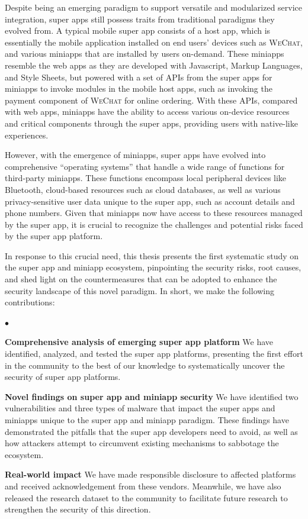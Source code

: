 \documentclass{osudissert96}
\renewenvironment{itemize}{
\begin{list}{$\bullet$}{
\setlength{\labelwidth}{8pt}
\setlength{\itemsep}{0pt}
\setlength{\leftmargin}{\labelwidth}
\addtolength{\leftmargin}{\labelsep}
\setlength{\parindent}{0pt}
\setlength{\listparindent}{\parindent}
\setlength{\parsep}{2pt}
\setlength{\topsep}{1pt}}}{\end{list}}
\begin{document}
Despite being an emerging paradigm to support versatile and modularized service integration, super apps still possess traits from traditional paradigms they evolved from. A typical mobile super app consists of a host app, which is essentially the mobile application installed on end users' devices such as \textsc{WeChat}, and various miniapps that are installed by users on-demand. These miniapps resemble the web apps as they are developed with Javascript, Markup Languages, and Style Sheets, but powered with a set of APIs from the super apps for miniapps to invoke modules in the mobile host apps, such as invoking the payment component of \textsc{WeChat} for online ordering. With these APIs, compared with web apps, miniapps have the ability to access various on-device resources and critical components through the super apps, providing users with native-like experiences.


 
However, with the emergence of miniapps, super apps have evolved into comprehensive ``operating systems'' that handle a wide range of functions for third-party miniapps. These functions encompass local peripheral devices like Bluetooth, cloud-based resources such as cloud databases, as well as various privacy-sensitive user data unique to the super app, such as account details and phone numbers. Given that miniapps now have access to these resources managed by the super app, it is crucial to recognize the challenges and potential risks faced by the super app platform. 

In response to this crucial need, this thesis presents the first systematic study on the super app and miniapp ecosystem, pinpointing the security risks, root causes, and shed light on the countermeasures that can be adopted to enhance the security landscape of this novel paradigm. In short, we make the following contributions:

\begin{itemize}
  \item \textbf{Comprehensive analysis of emerging super app platform} We have identified, analyzed, and tested the super app platforms, presenting the first effort in the community to the best of our knowledge to systematically uncover the security of super app platforms.
  \item \textbf{Novel findings on super app and miniapp security} We have identified two vulnerabilities and three types of malware that impact the super apps and miniapps unique to the super app and miniapp paradigm. These findings have demonstrated the pitfalls that the super app developers need to avoid, as well as how attackers attempt to circumvent existing mechanisms to sabbotage the ecosystem.
  \item \textbf{Real-world impact} We have made responsible disclosure to affected platforms and received acknowledgement from these vendors. Meanwhile, we have also released the research dataset to the community to facilitate future research to strengthen the security of this direction.
\end{itemize}
\end{document}
